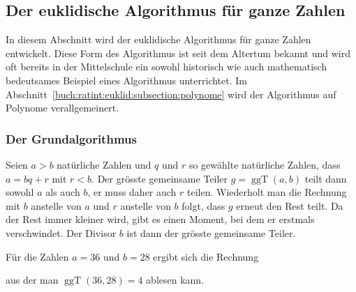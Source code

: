 %
%
\subsection{Der euklidische Algorithmus für ganze Zahlen
\label{buch:ratint:euklid:subsection:ganzezahlen}}
In diesem Abschnitt wird der euklidische Algorithmus für ganze
Zahlen entwickelt.
Diese Form des Algorithmus ist seit dem Altertum bekannt und wird
oft bereits in der Mittelschule ein sowohl historisch
wie auch mathematisch bedeutsames Beispiel eines Algorithmus
unterrichtet.
Im Abschnitt~\ref{buch:ratint:euklid:subsection:polynome} wird
der Algorithmus auf Polynome verallgemeinert.

%
%
\subsubsection{Der Grundalgorithmus}
Seien $a>b$ natürliche Zahlen und $q$ und $r$ so gewählte
natürliche Zahlen, dass $a=bq+r$ mit $r<b$.
Der grösste gemeinsame Teiler $g=\operatorname{ggT}(a,b)$ teilt dann
sowohl $a$ als auch $b$, er muss daher auch $r$ teilen.
Wiederholt man die Rechnung mit $b$ anstelle von $a$ und $r$ anstelle
von $b$ folgt, dass $g$ erneut den Rest teilt.
Da der Rest immer kleiner wird, gibt es einen Moment, bei dem
er erstmals verschwindet.
Der Divisor $b$ ist dann der grösste gemeinsame Teiler.

\begin{beispiel}
\label{buch:ratint:euklid:bsp:euklidzahlen}
Für die Zahlen $a=36$ und $b=28$ ergibt sich die Rechnung
\begin{center}

\end{center}
aus der man $\operatorname{ggT}(36,28)=4$ ablesen kann.
\end{beispiel}

%
%
